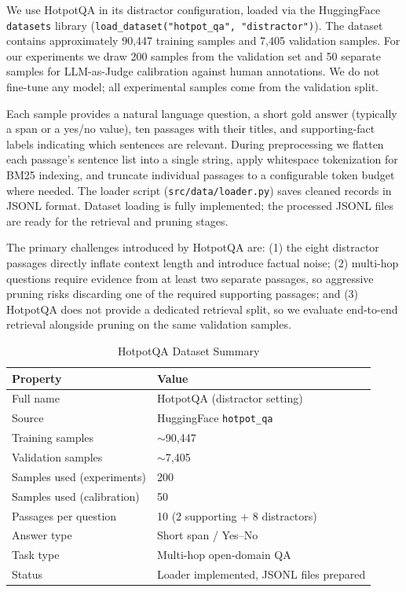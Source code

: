 \documentclass[11pt,a4paper]{article}
\begin{document}
We use HotpotQA in its distractor configuration, loaded via the HuggingFace \texttt{datasets} library (\texttt{load\_dataset("hotpot\_qa", "distractor")}). The dataset contains approximately 90,447 training samples and 7,405 validation samples. For our experiments we draw 200 samples from the validation set and 50 separate samples for LLM-as-Judge calibration against human annotations. We do not fine-tune any model; all experimental samples come from the validation split.

Each sample provides a natural language question, a short gold answer (typically a span or a yes/no value), ten passages with their titles, and supporting-fact labels indicating which sentences are relevant. During preprocessing we flatten each passage's sentence list into a single string, apply whitespace tokenization for BM25 indexing, and truncate individual passages to a configurable token budget where needed. The loader script (\texttt{src/data/loader.py}) saves cleaned records in JSONL format. Dataset loading is fully implemented; the processed JSONL files are ready for the retrieval and pruning stages.

The primary challenges introduced by HotpotQA are: (1) the eight distractor passages directly inflate context length and introduce factual noise; (2) multi-hop questions require evidence from at least two separate passages, so aggressive pruning risks discarding one of the required supporting passages; and (3) HotpotQA does not provide a dedicated retrieval split, so we evaluate end-to-end retrieval alongside pruning on the same validation samples.

\begin{table}[H]
\centering
\caption{HotpotQA Dataset Summary}
\begin{tabular}{ll}
\toprule
\textbf{Property} & \textbf{Value} \\
\midrule
Full name & HotpotQA (distractor setting) \\
Source & HuggingFace \texttt{hotpot\_qa} \\
Training samples & $\sim$90,447 \\
Validation samples & $\sim$7,405 \\
Samples used (experiments) & 200 \\
Samples used (calibration) & 50 \\
Passages per question & 10 (2 supporting + 8 distractors) \\
Answer type & Short span / Yes--No \\
Task type & Multi-hop open-domain QA \\
Status & Loader implemented, JSONL files prepared \\
\bottomrule
\end{tabular}
\end{table}
\end{document}
